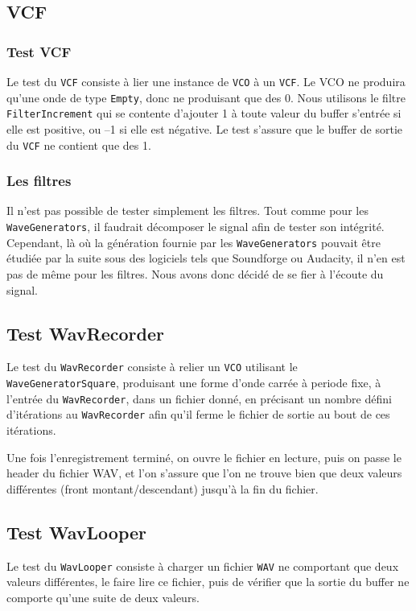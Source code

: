 \subsection{VCF}

\subsubsection{Test VCF}

Le test du \verb!VCF! consiste à lier une instance de \verb!VCO! à
un \verb!VCF!. Le VCO ne produira qu'une onde de type \verb!Empty!,
donc ne produisant que des 0. Nous utilisons le filtre
\verb!FilterIncrement! qui se contente d'ajouter 1 à toute valeur
du buffer s'entrée si elle est positive, ou --1 si elle est
négative. Le test s'assure que le buffer de sortie du \verb!VCF! ne
contient que des 1.

\subsubsection{Les filtres}

Il n'est pas possible de tester simplement les filtres. Tout comme
pour les \verb!WaveGenerators!, il faudrait décomposer le signal
afin de tester son intégrité. Cependant, là où la génération
fournie par les \verb!WaveGenerators! pouvait être étudiée par la
suite sous des logiciels tels que Soundforge ou Audacity, il n'en
est pas de même pour les filtres. Nous avons donc décidé de se fier
à l'écoute du signal.

\subsection{Test WavRecorder}

Le test du \verb!WavRecorder! consiste à relier un \verb!VCO!
utilisant le \verb!WaveGeneratorSquare!, produisant une forme
d'onde carrée à periode fixe, à l'entrée du \verb!WavRecorder!,
dans un fichier donné, en précisant un nombre défini d'itérations
au \verb!WavRecorder! afin qu'il ferme le fichier de sortie au bout
de ces itérations.

Une fois l'enregistrement terminé, on ouvre le fichier en lecture,
puis on passe le header du fichier WAV, et l'on s'assure que l'on
ne trouve bien que deux valeurs différentes (front
montant/descendant) jusqu'à la fin du fichier.

\subsection{Test WavLooper}

Le test du \verb!WavLooper! consiste à charger un fichier
\verb!WAV! ne comportant que deux valeurs différentes, le faire
lire ce fichier, puis de vérifier que la sortie du buffer ne
comporte qu'une suite de deux valeurs.


